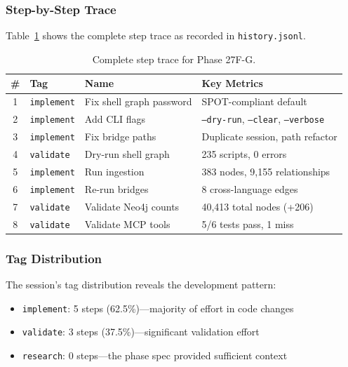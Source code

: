 \documentclass[11pt,letterpaper]{article}
\begin{document}
\subsubsection{Step-by-Step Trace}

Table~\ref{tab:steps} shows the complete step trace as recorded in
\texttt{history.jsonl}.

\begin{table}[h]
\centering
\caption{Complete step trace for Phase 27F-G.}
\label{tab:steps}
\small
\begin{tabular}{@{}cllp{5.8cm}@{}}
\toprule
\textbf{\#} & \textbf{Tag} & \textbf{Name} & \textbf{Key Metrics} \\
\midrule
1 & \texttt{implement}  & Fix shell graph password  & SPOT-compliant default \\
2 & \texttt{implement}  & Add CLI flags & \texttt{--dry-run}, \texttt{--clear}, \texttt{--verbose} \\
3 & \texttt{implement}  & Fix bridge paths & Duplicate session, path refactor \\
4 & \texttt{validate}   & Dry-run shell graph & 235 scripts, 0 errors \\
5 & \texttt{implement}  & Run ingestion & 383 nodes, 9{,}155 relationships \\
6 & \texttt{implement}  & Re-run bridges & 8 cross-language edges \\
7 & \texttt{validate}   & Validate Neo4j counts & 40{,}413 total nodes (+206) \\
8 & \texttt{validate}   & Validate MCP tools & 5/6 tests pass, 1 miss \\
\bottomrule
\end{tabular}
\end{table}

\subsubsection{Tag Distribution}

The session's tag distribution reveals the development pattern:

\begin{itemize}[nosep]
    \item \texttt{implement}: 5 steps (62.5\%)---majority of effort in code changes
    \item \texttt{validate}: 3 steps (37.5\%)---significant validation effort
    \item \texttt{research}: 0 steps---the phase spec provided sufficient context
\end{itemize}
\end{document}
